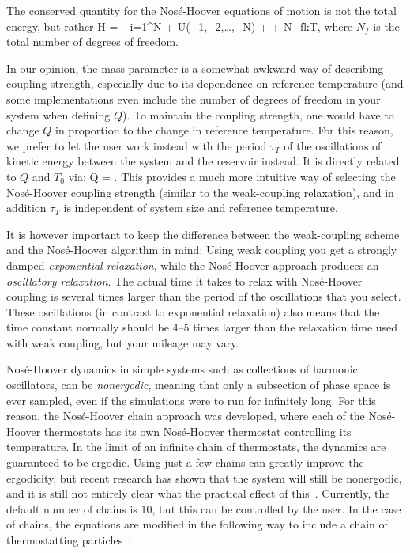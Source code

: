 The conserved quantity for the Nos{\'e}-Hoover equations of motion is not 
the total energy, but rather
\bea
H = \sum_{i=1}^{N}  + U\left(\rv_1,\rv_2,\ldots,\rv_N\right) + + N_fkT\xi,
\eea
where $N_f$ is the total number of degrees of freedom.

In our opinion, the mass parameter is a somewhat awkward way of
describing coupling strength, especially due to its dependence on
reference temperature (and some implementations even include the
number of degrees of freedom in your system when defining $Q$).  To
maintain the coupling strength, one would have to change $Q$ in
proportion to the change in reference temperature. For this reason, we
prefer to let the {\gromacs} user work instead with the period
$\tau_T$ of the oscillations of kinetic energy between the system and
the reservoir instead. It is directly related to $Q$ and $T_0$ via:
\beq
Q = .
\eeq
This provides a much more intuitive way of selecting the
Nos{\'e}-Hoover coupling strength (similar to the weak-coupling
relaxation), and in addition $\tau_T$ is independent of system size
and reference temperature.

It is however important to keep the difference between the 
weak-coupling scheme and the Nos{\'e}-Hoover algorithm in mind: 
Using weak coupling you get a
strongly damped {\em exponential relaxation}, 
while the Nos{\'e}-Hoover approach
produces an {\em oscillatory relaxation}. 
The actual time it takes to relax with Nos{\'e}-Hoover coupling is 
several times larger than the period of the
oscillations that you select. These oscillations (in contrast
to exponential relaxation) also means that
the time constant normally should be 4--5 times larger
than the relaxation time used with weak coupling, but your 
mileage may vary.

Nos{\'e}-Hoover dynamics in simple systems such as collections of
harmonic oscillators, can be {\em nonergodic}, meaning that only a
subsection of phase space is ever sampled, even if the simulations
were to run for infinitely long.  For this reason, the Nos{\'e}-Hoover
chain approach was developed, where each of the Nos{\'e}-Hoover
thermostats has its own Nos{\'e}-Hoover thermostat controlling its
temperature.  In the limit of an infinite chain of thermostats, the
dynamics are guaranteed to be ergodic. Using just a few chains can
greatly improve the ergodicity, but recent research has shown that the
system will still be nonergodic, and it is still not entirely clear
what the practical effect of this~\cite{Cooke2008}. Currently, the
default number of chains is 10, but this can be controlled by the
user.  In the case of chains, the equations are modified in the
following way to include a chain of thermostatting
particles~\cite{Martyna1992}:

